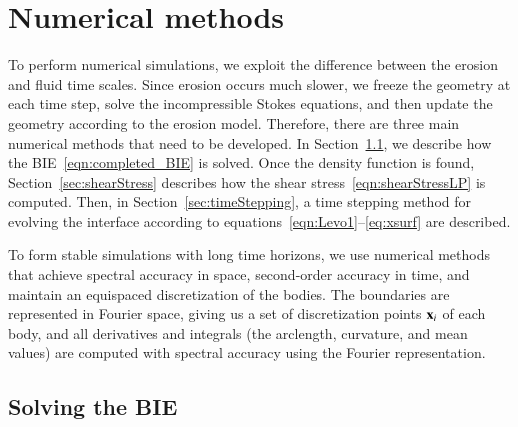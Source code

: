 \documentclass[preprint, 10pt]{elsarticle}
\begin{document}
\section{Numerical methods}
\label{s:method}
To perform numerical simulations, we exploit the difference between the erosion and fluid time scales.  Since erosion occurs much slower, we freeze the geometry at each time step, solve the incompressible Stokes equations, and then update the geometry according to the erosion model.  Therefore, there are three main numerical methods that need to be developed.  In Section~\ref{sec:BIE}, we describe how the BIE~\eqref{eqn:completed_BIE} is solved.  Once the density function is found, Section~\ref{sec:shearStress} describes how the shear stress~\eqref{eqn:shearStressLP} is computed.  Then, in Section~\ref{sec:timeStepping}, a time stepping method for evolving the interface according to equations~\eqref{eqn:Levo1}--\eqref{eq:xsurf} are described. 

To form stable simulations with long time horizons, we use numerical methods that achieve spectral accuracy in space, second-order accuracy in time, and maintain an equispaced discretization of the bodies.  The boundaries are represented in Fourier space, giving us a set of discretization points ${\mathbf{x}}_i$ of each body, and all derivatives and integrals (the arclength, curvature, and mean values) are computed with spectral accuracy using the Fourier representation.

\subsection{Solving the BIE}
\label{sec:BIE}
\end{document}
